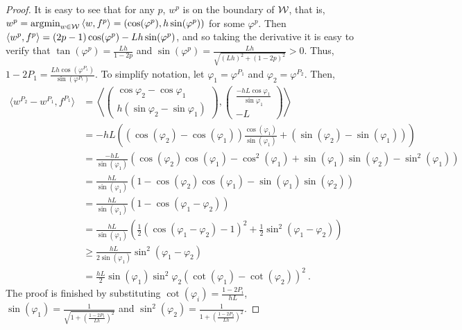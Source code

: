 \begin{proof}
	It is easy to see that for any $p$, $w^p$ is on the boundary of $\mathcal{W}$, that is, $w^p = \operatorname*{argmin}_{w\in\mathcal{W}} \left\langle w, f^p \right\rangle = (\cos (\varphi^p), h\sin (\varphi^p))$ for some $\varphi^p$. 
	Then $\left\langle w^p,f^p\right\rangle= (2p-1) \cos (\varphi^p) - Lh \sin (\varphi^p)$, and so taking the derivative it is easy to verify that $\tan(\varphi^p) = \frac{Lh}{1-2p}$ and $\sin(\varphi^p) = \frac{Lh}{\sqrt{(Lh)^2+(1-2p)^2}} >0$. 
	Thus, $1-2P_1 = \frac{Lh\cos (\varphi^{P_1})}{\sin (\varphi^{P_1})}$. To simplify notation, let $\varphi_1=\varphi^{P_1}$ and $\varphi_2=\varphi^{P_2}$. Then,
	\begin{align}
	\langle w^{P_2} - w^{P_1}, f^{P_1} \rangle & = \left\langle \left(
	\begin{array}{c}
	\cos \varphi_{2} - \cos \varphi_{1} \\
	h\left(\sin \varphi_{2} - \sin \varphi_{1} \right) 
	\end{array}
	\right),  \left( 
	\begin{array}{c}
	\frac{-hL\cos \varphi_{1}}{\sin \varphi_{1}} \\
	-L
	\end{array}
	\right) \right\rangle \nonumber \\ 
	& = -hL\left( \left( \cos (\varphi_{2}) - \cos (\varphi_{1} ) \right) \frac{\cos (\varphi_{1})}{\sin( \varphi_{1})} 
		 + \left(\sin (\varphi_{2}) - \sin (\varphi_{1} )\right)  \right)  \nonumber \\
	& = \frac{-hL}{\sin( \varphi_{1})} \left( \cos (\varphi_{2} )\cos (\varphi_{1} )- \cos^2(\varphi_{1} )+ \sin (\varphi_{1}) \sin (\varphi_{2}) - \sin^2(\varphi_{1}) \right)  \nonumber \\
	& = \frac{hL}{\sin (\varphi_{1})} \left( 1- \cos (\varphi_{2}) \cos (\varphi_{1})  - \sin (\varphi_{1}) \sin (\varphi_{2}) \right) \nonumber \\
	& = \frac{hL}{\sin (\varphi_{1})} \left( 1- \cos(\varphi_{1}-\varphi_{2}) \right) \nonumber \\
	& = \frac{hL}{\sin (\varphi_{1})} \left(\frac{1}{2}\left(\cos(\varphi_{1}-\varphi_{2})-1\right)^2 + \frac{1}{2} \sin^2 (\varphi_{1}-\varphi_{2})\right) \\
	& \ge  \frac{hL}{2 \sin (\varphi_{1})}  \sin^2 (\varphi_{1}-\varphi_{2}) \nonumber \\
	& = \frac{hL}{2} \sin (\varphi_{1}) \sin^2 \varphi_{2} \left(\cot (\varphi_{1} )- \cot (\varphi_{2})\right)^2~. %
	\end{align}
	The proof is finished by substituting $\cot (\varphi_i) = \frac{1-2P_i}{hL}$, $\sin(\varphi_1) = \frac{1}{\sqrt{1+\left(\frac{1-2P_1}{Lh}\right)^2}}$ and $\sin^2 (\varphi_2) =   \frac{1}{1+\left(\frac{1-2P_2}{Lh}\right)^2}$.
\end{proof}

